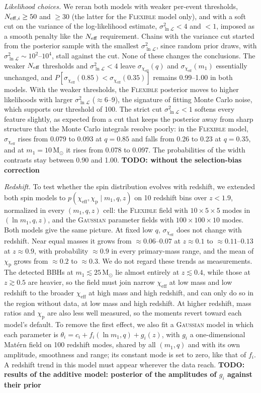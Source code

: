 \documentclass[%
 reprint,
 amsmath,amssymb,
 aps,
 prl,
 nofootinbib,nobibnotes,
 floatfix,
]{revtex4-2}
\newcommand{\Msun}{\ensuremath{\mathrm{M}_{\odot}}}
\newcommand{\chieff}{\ensuremath{\chi_{\mathrm{eff}}}}
\newcommand{\chip}{\ensuremath{\chi_{\mathrm{p}}}}
\newcommand{\todo}[1]{{\color{Blue}\bf TODO: #1}}
\newcommand{\flexiblespins}{\textsc{Flexible}\xspace}
\newcommand{\gaussianspins}{\textsc{Gaussian}\xspace}
\begin{document}
\textit{Likelihood choices.} We reran both models with weaker per-event thresholds, $N_{{\rm eff}, i} \geq 50$ and $\geq 30$ (the latter for the \flexiblespins model only), and with a soft cut on the variance of the log-likelihood estimate, $\sigma^2_{\ln\mathcal{L}} < 4$ and $< 1$, imposed as a smooth penalty like the $N_{\rm eff}$ requirement. Chains with the variance cut started from the posterior sample with the smallest $\sigma^2_{\ln\mathcal{L}}$, since random prior draws, with $\sigma^2_{\ln\mathcal{L}} \sim 10^2$--$10^4$, stall against the cut. None of these changes the conclusions. The weaker $N_{\rm eff}$ thresholds and $\sigma^2_{\ln\mathcal{L}} < 4$ leave $\sigma_{\chieff}(q)$ and $\sigma_{\chieff}(m_1)$ essentially unchanged, and $P[\sigma_{\chieff}(0.85) < \sigma_{\chieff}(0.35)]$ remains 0.99--1.00 in both models. With the weaker thresholds, the \flexiblespins posterior moves to higher likelihoods with larger $\sigma^2_{\ln\mathcal{L}}$ ($\approx 6$--9), the signature of fitting Monte Carlo noise, which supports our threshold of 100. The strict cut $\sigma^2_{\ln\mathcal{L}} < 1$ softens every feature slightly, as expected from a cut that keeps the posterior away from sharp structure that the Monte Carlo integrals resolve poorly: in the \flexiblespins model, $\sigma_{\chieff}$ rises from 0.079 to 0.093 at $q = 0.85$ and falls from 0.26 to 0.23 at $q = 0.35$, and at $m_1 = 10\,\Msun$ it rises from 0.078 to 0.097. The probabilities of the width contrasts stay between 0.90 and 1.00. \todo{without the selection-bias correction}

\textit{Redshift.} To test whether the spin distribution evolves with redshift, we extended both spin models to $p(\chieff, \chip \mid m_1, q, z)$ on 10 redshift bins over $z < 1.9$, normalized in every $(m_1, q, z)$ cell: the \flexiblespins field with $10 \times 5 \times 5$ modes in $(\ln m_1, q, z)$, and the \gaussianspins parameter fields with $100 \times 100 \times 10$ modes. Both models give the same picture. At fixed low $q$, $\sigma_{\chieff}$ does not change with redshift. Near equal masses it grows from $\approx 0.06$--$0.07$ at $z \approx 0.1$ to $\approx 0.11$--$0.13$ at $z \approx 0.9$, with probability $\approx 0.9$ in every primary-mass range, and the mean of $\chip$ grows from $\approx 0.2$ to $\approx 0.3$. We do not regard these trends as measurements. The detected \acp{BBH} at $m_1 \lesssim 25\,\Msun$ lie almost entirely at $z \lesssim 0.4$, while those at $z \gtrsim 0.5$ are heavier, so the field must join narrow $\chieff$ at low mass and low redshift to the broader $\chieff$ at high mass and high redshift, and can only do so in the region without data, at low mass and high redshift. At higher redshift, mass ratios and $\chip$ are also less well measured, so the moments revert toward each model's default. To remove the first effect, we also fit a \gaussianspins model in which each parameter is $\theta_i = c_i + f_i(\ln m_1, q) + g_i(z)$, with $g_i$ a one-dimensional Mat\'ern field on 100 redshift modes, shared by all $(m_1, q)$ and with its own amplitude, smoothness and range; its constant mode is set to zero, like that of $f_i$. A redshift trend in this model must appear wherever the data reach. \todo{results of the additive model: posterior of the amplitudes of $g_i$ against their prior}
\end{document}
